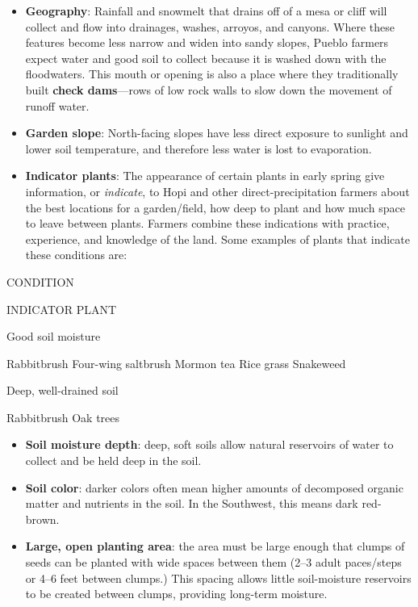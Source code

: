 \documentclass[12pt,]{article}
\providecommand{\tightlist}{%
  \setlength{\itemsep}{0pt}\setlength{\parskip}{0pt}}
\begin{document}
\begin{itemize}
\tightlist
\item
  \textbf{Geography}: Rainfall and snowmelt that drains off of a mesa or cliff will collect and flow into drainages, washes, arroyos, and canyons. Where these features become less narrow and widen into sandy slopes, Pueblo farmers expect water and good soil to collect because it is washed down with the floodwaters. This mouth or opening is also a place where they traditionally built \textbf{check dams}---rows of low rock walls to slow down the movement of runoff water.
\item
  \textbf{Garden slope}: North-facing slopes have less direct exposure to sunlight and lower soil temperature, and therefore less water is lost to evaporation.
\item
  \textbf{Indicator plants}: The appearance of certain plants in early spring give information, or \emph{indicate}, to Hopi and other direct-precipitation farmers about the best locations for a garden/field, how deep to plant and how much space to leave between plants. Farmers combine these indications with practice, experience, and knowledge of the land. Some examples of plants that indicate these conditions are:
\end{itemize}

CONDITION

INDICATOR PLANT

Good soil moisture

Rabbitbrush
Four-wing saltbrush
Mormon tea
Rice grass
Snakeweed

Deep, well-drained soil

Rabbitbrush
Oak trees

\begin{itemize}
\tightlist
\item
  \textbf{Soil moisture depth}: deep, soft soils allow natural reservoirs of water to collect and be held deep in the soil.
\item
  \textbf{Soil color}: darker colors often mean higher amounts of decomposed organic matter and nutrients in the soil. In the Southwest, this means dark red-brown.
\item
  \textbf{Large, open planting area}: the area must be large enough that clumps of seeds can be planted with wide spaces between them (2--3 adult paces/steps or 4--6 feet between clumps.) This spacing allows little soil-moisture reservoirs to be created between clumps, providing long-term moisture.
\end{itemize}
\end{document}
